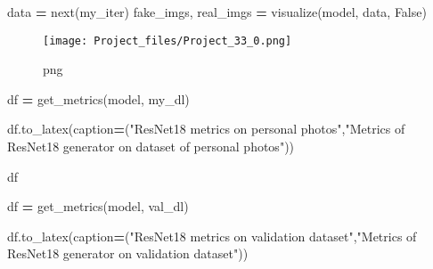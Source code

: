 \documentclass[
]{article}
\newenvironment{Shaded}{\begin{snugshade}}{\end{snugshade}}
\newcommand{\BuiltInTok}[1]{#1}
\newcommand{\NormalTok}[1]{#1}
\newcommand{\OperatorTok}[1]{\textcolor[rgb]{0.81,0.36,0.00}{\textbf{#1}}}
\newcommand{\StringTok}[1]{\textcolor[rgb]{0.31,0.60,0.02}{#1}}
\newcommand{\VariableTok}[1]{\textcolor[rgb]{0.00,0.00,0.00}{#1}}
\begin{document}
\begin{Shaded}
\begin{Highlighting}[]
\NormalTok{data }\OperatorTok{=} \BuiltInTok{next}\NormalTok{(my\_iter)}
\NormalTok{fake\_imgs, real\_imgs }\OperatorTok{=}\NormalTok{ visualize(model, data, }\VariableTok{False}\NormalTok{)}
\end{Highlighting}
\end{Shaded}

\begin{figure}
\centering
\texttt{[image: Project\_files/Project\_33\_0.png]}
\caption{png}
\end{figure}

\begin{Shaded}
\begin{Highlighting}[]
\NormalTok{df }\OperatorTok{=}\NormalTok{ get\_metrics(model, my\_dl)}
\end{Highlighting}
\end{Shaded}

\begin{Shaded}
\begin{Highlighting}[]
\NormalTok{df.to\_latex(caption}\OperatorTok{=}\NormalTok{(}\StringTok{"ResNet18 metrics on personal photos"}\NormalTok{,}\StringTok{"Metrics of ResNet18 generator on dataset of personal photos"}\NormalTok{))}
\end{Highlighting}
\end{Shaded}

\begin{Shaded}
\begin{Highlighting}[]
\NormalTok{df}
\end{Highlighting}
\end{Shaded}

\begin{Shaded}
\begin{Highlighting}[]
\NormalTok{df }\OperatorTok{=}\NormalTok{ get\_metrics(model, val\_dl)}
\end{Highlighting}
\end{Shaded}

\begin{Shaded}
\begin{Highlighting}[]
\NormalTok{df.to\_latex(caption}\OperatorTok{=}\NormalTok{(}\StringTok{"ResNet18 metrics on validation dataset"}\NormalTok{,}\StringTok{"Metrics of ResNet18 generator on validation dataset"}\NormalTok{))}
\end{Highlighting}
\end{Shaded}
\end{document}
